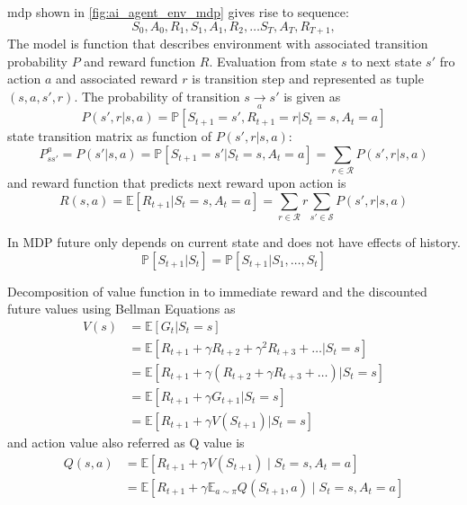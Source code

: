 \acrlong{mdp} shown in \autoref{fig:ai_agent_env_mdp} gives rise to sequence:
\begin{equation*}
    S_0, A_0, R_1,S_1, A_1, R_2, \dots S_{T}, A_{T}, R_{T+1},
\end{equation*}
The model is function that describes environment with associated transition probability $P$ and reward function $R$. Evaluation from state $s$ to next state $s'$ fro action $a$ and associated reward $r$ is transition step and represented as tuple $(s,a,s',r)$. The probability of transition ${\displaystyle s\xrightarrow[a]{} s'}$ is given as
\begin{equation}
P(s',r|s,a)=\mathbb{P} [S_{t+1} =s',R_{t+1} =r|S_{t} =s,A_{t} =a]
\end{equation}
state transition matrix as function of $\displaystyle P(s',r|s,a)$:
\begin{equation}
P^{a}_{ss'} =P(s'|s,a)=\mathbb{P} [S_{t+1} =s'|S_{t} =s,A_{t} =a]=\sum _{r\in \mathcal{R}} P(s',r|s,a)
\end{equation}
and reward function that predicts next reward upon action is
\begin{equation*}
R(s,a)=\mathbb{E} [R_{t+1} |S_{t} =s,A_{t} =a]=\sum _{r\in \mathcal{R}} r\sum _{s'\in \mathcal{S}} P(s',r|s,a)
\end{equation*}


In MDP future only depends on current state and does not have effects of history.
\begin{equation}
\mathbb{P} [S_{t+1} |S_{t} ]=\mathbb{P} [S_{t+1} |S_{1} ,\dotsc ,S_{t} ]
\end{equation}

Decomposition of value function in to immediate reward and the discounted future values using Bellman Equations as
\begin{equation}
\begin{aligned}
V(s) & =\mathbb{E} [G_{t} |S_{t} =s]\\
 & =\mathbb{E} [R_{t+1} +\gamma R_{t+2} +\gamma ^{2} R_{t+3} +\dotsc |S_{t} =s]\\
 & =\mathbb{E} [R_{t+1} +\gamma (R_{t+2} +\gamma R_{t+3} +\dotsc )|S_{t} =s]\\
 & =\mathbb{E} [R_{t+1} +\gamma G_{t+1} |S_{t} =s]\\
 & =\mathbb{E} [R_{t+1} +\gamma V(S_{t+1} )|S_{t} =s]
\end{aligned}
\end{equation}
and action value also referred as Q value is 
\begin{equation}
\begin{aligned}
Q(s,a) & =\mathbb{E} [R_{t+1} +\gamma V(S_{t+1} )\mid S_{t} =s,A_{t} =a]\\
 & =\mathbb{E} [R_{t+1} +\gamma \mathbb{E}_{a\sim \pi } Q(S_{t+1} ,a)\mid S_{t} =s,A_{t} =a]
\end{aligned}
\end{equation}


